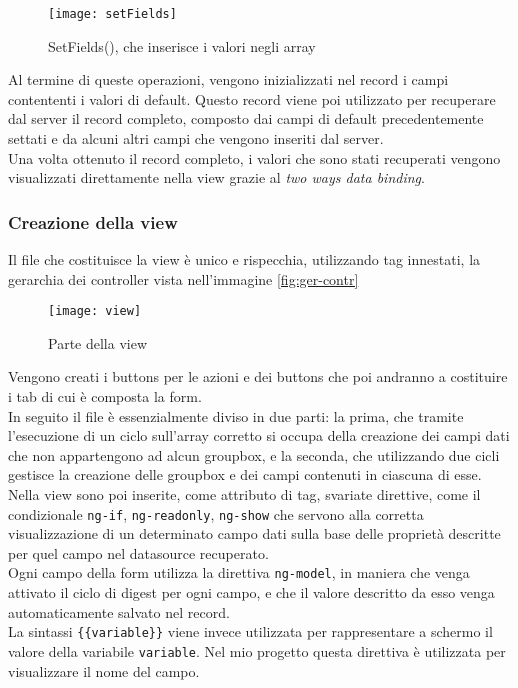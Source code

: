 \begin{figure}[h]
	\centering
	\texttt{[image: setFields]}
	\caption{SetFields(), che inserisce i valori negli array}
	\label{fig:set-fields}
\end{figure}
Al termine di queste operazioni, vengono inizializzati nel record i campi contententi i valori di default. Questo record viene poi utilizzato per recuperare dal server il record completo, composto dai campi di default precedentemente settati e da alcuni altri campi che vengono inseriti dal server.\\
Una volta ottenuto il record completo, i valori che sono stati recuperati vengono visualizzati direttamente nella view grazie al \emph{two ways data binding}.

\subsubsection{Creazione della view}
Il file che costituisce la view è unico e rispecchia, utilizzando tag innestati, la gerarchia dei controller vista nell'immagine \ref{fig:ger-contr}\\
\begin{figure}[h]
	\centering
	\texttt{[image: view]}
	\caption{Parte della view}
	\label{fig:view}
\end{figure}

Vengono creati i buttons per le azioni e dei buttons che poi andranno a costituire i tab di cui è composta la form.\\
In seguito il file è essenzialmente diviso in due parti: la prima, che tramite l'esecuzione di un ciclo sull'array corretto si occupa della creazione dei campi dati che non appartengono ad alcun groupbox, e la seconda, che utilizzando due cicli gestisce la creazione delle groupbox e dei campi contenuti in ciascuna di esse.
Nella view sono poi inserite, come attributo di tag, svariate direttive, come il condizionale \lstinline[language=HTML]!ng-if!, \lstinline[language=HTML]!ng-readonly!, \lstinline[language=HTML]!ng-show! che servono alla corretta visualizzazione di un determinato campo dati sulla base delle proprietà descritte per quel campo nel datasource recuperato. \\
Ogni campo della form utilizza la direttiva \lstinline[language=HTML]!ng-model!, in maniera che venga attivato il ciclo di digest per ogni campo, e che il valore descritto da esso venga automaticamente salvato nel record. \\ La sintassi \lstinline[language=HTML]!{{variable}}! viene invece utilizzata per rappresentare a schermo il valore della variabile \lstinline[language=HTML]!variable!. Nel mio progetto questa direttiva è utilizzata per visualizzare il nome del campo.

